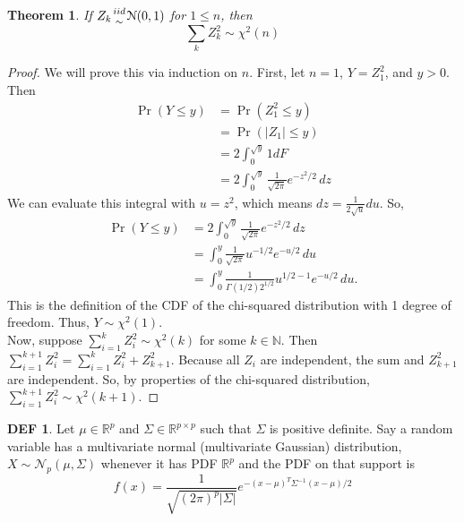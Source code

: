 \documentclass{article}
\newtheorem{theorem}{Theorem}
\theoremstyle{definition}\newtheorem{definition}{DEF}
\theoremstyle{definition}\newtheorem{example}{Ex}
\theoremstyle{lemma}\newtheorem{lemma}{Lemma}
\theoremstyle{corrolary}\newtheorem{corrolary}{Cor}
\begin{document}
\begin{theorem}
If $Z_k {iid \atop \sim} \mathcal{N}(0,1)$ for $1 \leq n$, then
\begin{equation}
\sum_k Z_k^2 \sim \chi^2(n)
\end{equation}
\end{theorem}
\begin{proof}
We will prove this via induction on $n$.
First, let $n=1$, $Y=Z_1^2$, and $y>0$.
Then
\begin{align*}
\Pr(Y \le y) &= \Pr(Z_1^2 \le y) \\
&= \Pr(|Z_1| \le y) \\
&= 2\int_0^{\sqrt{y}} 1dF \\
&= 2\int_0^{\sqrt{y}} \frac{1}{\sqrt{2\pi}} e^{-z^2/2}\,dz
\end{align*}
We can evaluate this integral with $u=z^2$, which means $dz=\frac{1}{2\sqrt{u}}du$.
So,
\begin{align*}
\Pr(Y\le y)
&= 2\int_0^{\sqrt y} \frac{1}{\sqrt{2\pi}} e^{-z^2/2}\,dz \\
&= \int_0^y \frac{1}{\sqrt{2\pi}} u^{-1/2} e^{-u/2}\,du \\
&= \int_0^y \frac{1}{\Gamma(1/2)2^{1/2}} u^{1/2-1} e^{-u/2}\,du.
\end{align*}
This is the definition of the CDF of the chi-squared distribution with 1 degree of freedom.
Thus, $Y\sim \chi^2(1)$.\\
Now, suppose $\sum_{i=1}^k Z_i^2 \sim \chi^2(k)$ for some $k\in\mathbb{N}$.
Then $\sum_{i=1}^{k+1}Z_i^2=\sum_{i=1}^k Z_i^2 + Z_{k+1}^2$.
Because all $Z_i$ are independent, the sum and $Z_{k+1}^2$ are independent.
So, by properties of the chi-squared distribution, $\sum_{i=1}^{k+1}Z_i^2 \sim \chi^2 (k+1)$.
\end{proof}

\begin{definition}
Let $\mu\in\mathbb{R}^p$ and $\Sigma\in\mathbb{R}^{p\times p}$ such that $\Sigma$ is positive definite.
Say a random variable has a multivariate normal (multivariate Gaussian) distribution, $X\sim \mathcal{N}_p(\mu, \Sigma)$ whenever it has PDF $\mathbb{R}^p$ and the PDF on that support is
\begin{equation}
f(x)=\frac{1}{\sqrt{(2\pi)^p|\Sigma|}}e^{-(x-\mu)^T\Sigma^{-1}(x-\mu)/2}
\end{equation}
\end{definition}
\end{document}
